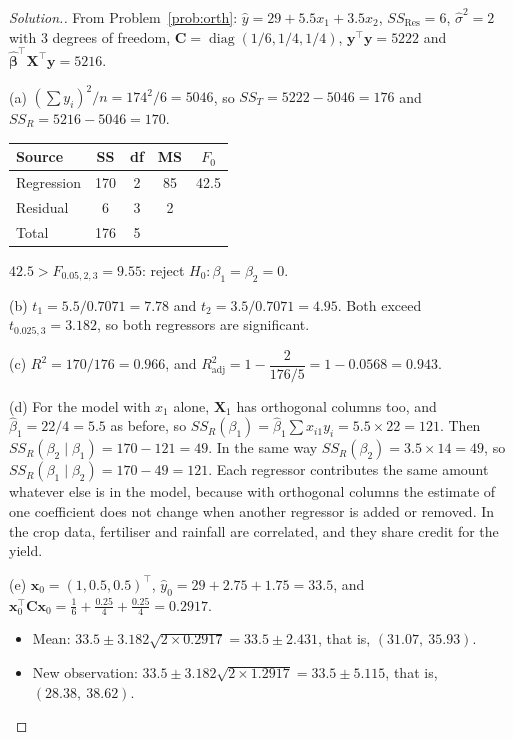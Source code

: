 \documentclass[11pt,a4paper]{article}
\numberwithin{equation}{section}
\theoremstyle{definition}
\newenvironment{solution}
  {\renewcommand{\qedsymbol}{}\begin{proof}[\textit{Solution}.]}
  {\end{proof}}
\begin{document}
\begin{solution}
From Problem~\ref{prob:orth}: $\hat y = 29 + 5.5x_1 + 3.5x_2$, $SS_{\mathrm{Res}} = 6$,
$\hat\sigma^2 = 2$ with $3$ degrees of freedom, $\mathbf{C} = \operatorname{diag}(1/6, 1/4, 1/4)$,
$\mathbf{y}^\top\mathbf{y} = 5222$ and $\hat{\boldsymbol\beta}^\top\mathbf{X}^\top\mathbf{y} = 5216$.

(a) $(\sum y_i)^2/n = 174^2/6 = 5046$, so $SS_T = 5222 - 5046 = 176$ and
$SS_R = 5216 - 5046 = 170$.
\begin{center}
\begin{tabular}{lcccc}
\hline
Source & SS & df & MS & $F_0$ \\
\hline
Regression & 170 & 2 & 85 & 42.5 \\
Residual & 6 & 3 & 2 & \\
\hline
Total & 176 & 5 & & \\
\hline
\end{tabular}
\end{center}
$42.5 > F_{0.05,2,3} = 9.55$: reject $H_0\colon \beta_1 = \beta_2 = 0$.

(b) $t_1 = 5.5/0.7071 = 7.78$ and $t_2 = 3.5/0.7071 = 4.95$. Both exceed
$t_{0.025,3} = 3.182$, so both regressors are significant.

(c) $R^2 = 170/176 = 0.966$, and $R^2_{\mathrm{adj}} = 1 - \dfrac{2}{176/5} = 1 - 0.0568 = 0.943$.

(d) For the model with $x_1$ alone, $\mathbf{X}_1$ has orthogonal columns too, and
$\hat\beta_1 = 22/4 = 5.5$ as before, so $SS_R(\beta_1) = \hat\beta_1 \sum x_{i1}y_i = 5.5 \times 22 = 121$.
Then $SS_R(\beta_2 \mid \beta_1) = 170 - 121 = 49$. In the same way
$SS_R(\beta_2) = 3.5 \times 14 = 49$, so $SS_R(\beta_1 \mid \beta_2) = 170 - 49 = 121$. Each
regressor contributes the same amount whatever else is in the model, because with orthogonal
columns the estimate of one coefficient does not change when another regressor is added or
removed. In the crop data, fertiliser and rainfall are correlated, and they share credit for
the yield.

(e) $\mathbf{x}_0 = (1, 0.5, 0.5)^\top$, $\hat y_0 = 29 + 2.75 + 1.75 = 33.5$, and
$\mathbf{x}_0^\top\mathbf{C}\mathbf{x}_0 = \frac16 + \frac{0.25}{4} + \frac{0.25}{4} = 0.2917$.
\begin{itemize}
\item Mean: $33.5 \pm 3.182\sqrt{2 \times 0.2917} = 33.5 \pm 2.431$, that is, $(31.07,\ 35.93)$.
\item New observation: $33.5 \pm 3.182\sqrt{2 \times 1.2917} = 33.5 \pm 5.115$, that is, $(28.38,\ 38.62)$.
\end{itemize}
\end{solution}
\end{document}
